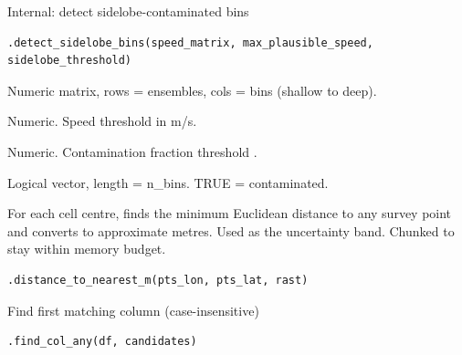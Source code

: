 \documentclass[a4paper]{book}
\begin{document}
%
\begin{Description}
Internal: detect sidelobe-contaminated bins
\end{Description}
%
\begin{Usage}
\begin{verbatim}
.detect_sidelobe_bins(speed_matrix, max_plausible_speed, sidelobe_threshold)
\end{verbatim}
\end{Usage}
%
\begin{Arguments}
\begin{ldescription}
\item[\code{speed\_matrix}] Numeric matrix, rows = ensembles, cols = bins (shallow to deep).

\item[\code{max\_plausible\_speed}] Numeric. Speed threshold in m/s.

\item[\code{sidelobe\_threshold}] Numeric. Contamination fraction threshold .
\end{ldescription}
\end{Arguments}
%
\begin{Value}
Logical vector, length = n\_bins. TRUE = contaminated.
\end{Value}
%
\begin{Description}
For each cell centre, finds the minimum Euclidean distance to any survey
point and converts to approximate metres. Used as the uncertainty band.
Chunked to stay within memory budget.
\end{Description}
%
\begin{Usage}
\begin{verbatim}
.distance_to_nearest_m(pts_lon, pts_lat, rast)
\end{verbatim}
\end{Usage}
%
\begin{Description}
Find first matching column (case-insensitive)
\end{Description}
%
\begin{Usage}
\begin{verbatim}
.find_col_any(df, candidates)
\end{verbatim}
\end{Usage}
\end{document}
